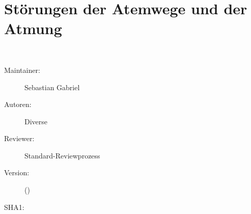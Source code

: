 \def\ChapterCode{RSP}
\chapter
[\CO{[ATM]} Störungen der Atemwege und der Atmung]
{Störungen der Atemwege und der Atmung}
\label{topic:respiratorische-notfaelle}
\label{chp:atm}
\ChapterIntro
{%
~~~
}
{%
\begin{description}
  \item[Maintainer:] Sebastian Gabriel
  \item[Autoren:] Diverse
  \item[Reviewer:] Standard-Reviewprozess
  \item[Version:] {\VarDocVersionTypeName} ({\VarDocVersionTypeDescription})
  \item[SHA1:] {\DocGitCommit}
\end{description}

{\TxTeilkapitelAASS}
}

